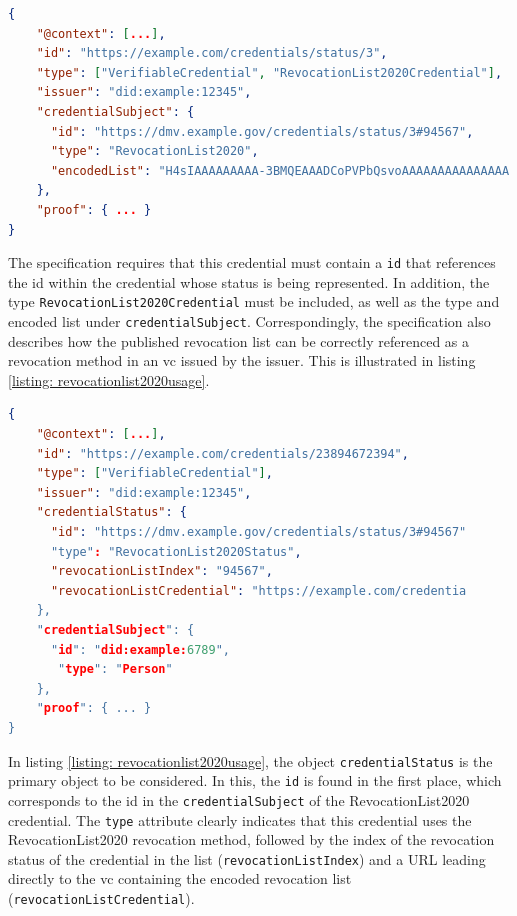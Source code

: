         \begin{lstlisting}[language=json, caption={[Example RevocationList2020 credentials]Example RevocationList2020 credentials (edited and extracted from \cite{longley_revocation_2021})}, captionpos=b, label={listing: revocationlist2020credential}]  
{
    "@context": [...],
    "id": "https://example.com/credentials/status/3", 
    "type": ["VerifiableCredential", "RevocationList2020Credential"],
    "issuer": "did:example:12345", 
    "credentialSubject": {
      "id": "https://dmv.example.gov/credentials/status/3#94567",
      "type": "RevocationList2020",
      "encodedList": "H4sIAAAAAAAAA-3BMQEAAADCoPVPbQsvoAAAAAAAAAAAAAAA..."
    },
    "proof": { ... }
}\end{lstlisting}

        The specification requires that this credential must contain a \texttt{id} that references the id within the credential whose status is being represented.  In addition, the type \texttt{RevocationList2020Credential} must be included, as well as the type and encoded list under \texttt{credentialSubject}. Correspondingly, the specification also describes how the published revocation list can be correctly referenced as a revocation method in an \ac{vc} issued by the issuer. This is illustrated in listing \ref{listing: revocationlist2020usage}.
        \newline
        
        \begin{lstlisting}[language=json, caption={[Example \acs{vc} referencing a RevocationList2020 credential]Example \ac{vc} referencing a RevocationList2020 credential (edited and extracted from \cite{longley_revocation_2021})}, captionpos=b, label={listing: revocationlist2020usage}]  
{
    "@context": [...],
    "id": "https://example.com/credentials/23894672394", 
    "type": ["VerifiableCredential"],
    "issuer": "did:example:12345",
    "credentialStatus": {
      "id": "https://dmv.example.gov/credentials/status/3#94567"
      "type": "RevocationList2020Status",
      "revocationListIndex": "94567",
      "revocationListCredential": "https://example.com/credentia
    }, 
    "credentialSubject": {
      "id": "did:example:6789",
       "type": "Person"
    },
    "proof": { ... } 
}\end{lstlisting}
    
    In listing \ref{listing: revocationlist2020usage}, the object \texttt{credentialStatus} is the primary object to be considered. In this, the \texttt{id} is found in the first place, which corresponds to the id in the \texttt{credentialSubject} of the RevocationList2020 credential. The \texttt{type} attribute clearly indicates that this credential uses the RevocationList2020 revocation method, followed by the index of the revocation status of the credential in the list (\texttt{revocationListIndex}) and a URL leading directly to the \ac{vc} containing the encoded revocation list (\texttt{revocationListCredential}). \cite{longley_revocation_2021}
    
